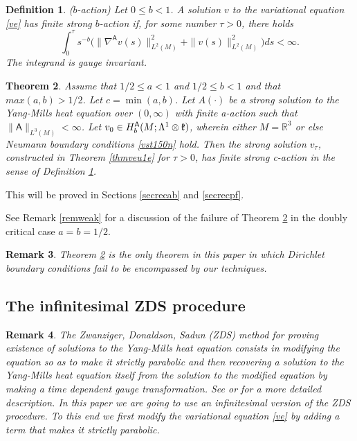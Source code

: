 \documentclass[12pt]{article}
\newtheorem{theorem}{Theorem}[section]
\newtheorem{definition}[theorem]{Definition}
\newtheorem{remark}[theorem]{Remark}
\def \L{\Lambda}
\def \R{\mathbb R}
\def \As{\mathsf{A}}
\def \kf{\frak k}
\def \beq{\begin{equation}}
\def \eeq{\end{equation}}
\def \n{\nabla}
\def \eref{\eqref}
\numberwithin{equation}{section}
\begin{document}
       \begin{definition}\label{defb-act}{\rm 
       ($b$-action) Let $0 \le b <1$. 
A solution $v$ to the variational equation \eref{ve}
 has     {\it  finite  strong $b$-action}  if, for some number $\tau >0$, there holds 
\beq
\int_0^\tau s^{-b} \Big(\|\n^{\As} v(s)\|_{L^2(M)}^2 + \| v(s)\|_{L^2(M)}^2\Big) ds < \infty.      \label{ymh15b}
\eeq
The integrand is gauge invariant.
}
\end{definition}



\begin{theorem}\label{thmveu2b}  
 Assume that  $1/2 \le a < 1$ and  $1/2 \le b <1$ and that $max(a,b) > 1/2$. 
Let $c = \min (a,b)$.  
      Let $A(\cdot)$ be a strong solution  to the Yang-Mills heat equation over $(0, \infty)$ with finite a-action
   such that $\|\As\|_{L^3(M)} < \infty$. 
    Let $v_0 \in H_{b}^\As(M; \L^1\otimes \kf)$, wherein  either $M= \R^3$ or else Neumann
     boundary conditions  \eref{vst150n} hold. 
 Then  the strong solution $v_\tau$, 
 constructed in  Theorem \ref{thmveu1e} for $\tau >0$,
           has finite strong c-action in the sense of Definition \ref{defb-act}. 
\end{theorem}
This will be proved in Sections \ref{secrecab} and \ref{secrecpf}.

 See Remark \ref{remweak} for a discussion of the failure of Theorem \ref{thmveu2b} in the doubly critical case
 $a = b = 1/2$.


\begin{remark} {\rm Theorem \ref{thmveu2b} is the only theorem in this paper 
in which Dirichlet boundary conditions  fail to be encompassed  by our techniques.
}
\end{remark}


\subsection{The infinitesimal ZDS procedure}
\begin{remark} {\rm  
 The  Zwanziger, Donaldson, Sadun \cite{Z, Do1,  Sa} (ZDS) 
method for proving
 existence of solutions to the Yang-Mills heat equation consists in modifying the 
 equation so as to make it strictly parabolic and then recovering a solution to the
 Yang-Mills heat equation
 itself from the solution to the modified equation by making a time dependent gauge
  transformation. 
 See   \cite{CG1} or \cite{G70} for a more detailed description.
 In this paper we are  going to use an infinitesimal version of the ZDS procedure.
 To this end we  first modify the variational equation \eref{ve} by adding a term
  that makes it strictly parabolic.
 }
 \end{remark}
 
\end{document}
